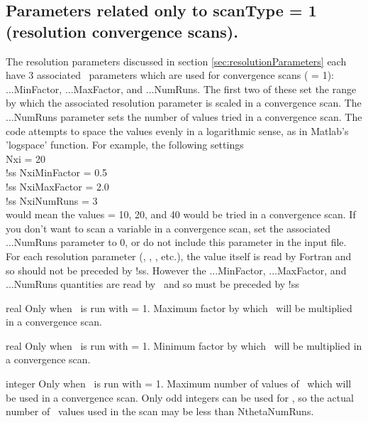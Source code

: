 \subsection{Parameters related only to {\ttfamily scanType} = 1 (resolution convergence scans).}
\label{sec:scanType1Parameters}

The resolution parameters discussed in section \ref{sec:resolutionParameters}
each have 3 associated \sfincsScan~parameters
which are used for convergence scans ( = 1): {\ttfamily ...MinFactor}, {\ttfamily ...MaxFactor}, and {\ttfamily ...NumRuns}.
The first two of these set the range by which the associated resolution parameter is scaled
in a convergence scan. The {\ttfamily ...NumRuns} parameter sets the number of values tried in a
convergence scan. The code attempts to space the values evenly in a logarithmic
sense, as in Matlab's 'logspace' function. For example, the following settings\\
{\ttfamily
    Nxi = 20\\
!ss NxiMinFactor = 0.5\\
!ss NxiMaxFactor = 2.0\\
!ss NxiNumRuns = 3\\
}
would mean the values \Nxi = 10, 20, and 40 would be tried in a convergence scan.
If you don't want to scan a variable in a convergence scan, set the associated
{\ttfamily ...NumRuns} parameter to 0, or do not include this parameter in the input file.
For each resolution parameter (\Ntheta, \Nzeta, \Nxi, etc.), the value itself is read by
Fortran and so should not be preceded by {\ttfamily !ss}.  However the {\ttfamily ...MinFactor}, {\ttfamily ...MaxFactor}, and {\ttfamily ...NumRuns}
quantities are read by \sfincsScan~and so must be preceded by {\ttfamily !ss}

\myhrule

{real}
{Only when \sfincsScan~is run with  = 1.}
{Maximum factor by which \Ntheta~will be multiplied in a convergence scan.}

\myhrule

{real}
{Only when \sfincsScan~is run with  = 1.}
{Minimum factor by which \Ntheta~will be multiplied in a convergence scan.}

\myhrule

{integer}
{Only when \sfincsScan~is run with  = 1.}
{Maximum number of values of \Ntheta~which will be used in a convergence scan.  Only odd integers can be used
for \Ntheta, so the actual number of \Ntheta~values used in the scan may be less than {\ttfamily NthetaNumRuns}.}

